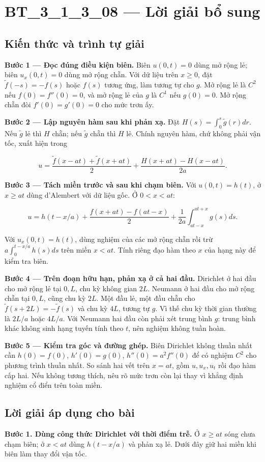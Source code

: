 \documentclass[10pt,a4paper]{article}
\begin{document}
\section*{BT\_3\_1\_3\_08 — Lời giải bổ sung}
\subsection*{Kiến thức và trình tự giải}
\textbf{Bước 1 — Đọc đúng điều kiện biên.} Biên $u(0,t)=0$ dùng mở rộng lẻ; biên $u_x(0,t)=0$ dùng mở rộng chẵn. Với dữ liệu trên $x\ge0$, đặt $\widetilde f(-s)=-f(s)$ hoặc $f(s)$ tương ứng, làm tương tự cho $g$. Mở rộng lẻ là $C^2$ nếu $f(0)=f''(0)=0$, và mở rộng lẻ của $g$ là $C^1$ nếu $g(0)=0$. Mở rộng chẵn đòi $f'(0)=g'(0)=0$ cho mức trơn ấy.

\textbf{Bước 2 — Lập nguyên hàm sau khi phản xạ.} Đặt $H(s)=\int_0^s\widetilde g(r)dr$. Nếu $\widetilde g$ lẻ thì $H$ chẵn; nếu $\widetilde g$ chẵn thì $H$ lẻ. Chính nguyên hàm, chứ không phải vận tốc, xuất hiện trong


\[
u=\frac{\widetilde f(x-at)+\widetilde f(x+at)}2+\frac{H(x+at)-H(x-at)}{2a}.
\]


\textbf{Bước 3 — Tách miền trước và sau khi chạm biên.} Với $u(0,t)=h(t)$, ở $x\ge at$ dùng d'Alembert với dữ liệu gốc. Ở $0<x<at$:


\[
u=h(t-x/a)+\frac{f(x+at)-f(at-x)}2+\frac1{2a}\int_{at-x}^{at+x}g(s)ds.
\]


Với $u_x(0,t)=h(t)$, dùng nghiệm của các mở rộng chẵn rồi trừ $a\int_0^{t-x/a}h(s)ds$ trên miền $x<at$. Tính riêng đạo hàm theo $x$ của hạng này để kiểm tra biên.

\textbf{Bước 4 — Trên đoạn hữu hạn, phản xạ ở cả hai đầu.} Dirichlet ở hai đầu cho mở rộng lẻ tại $0,L$, chu kỳ không gian $2L$. Neumann ở hai đầu cho mở rộng chẵn tại $0,L$, cũng chu kỳ $2L$. Một đầu lẻ, một đầu chẵn cho $\widetilde f(s+2L)=-\widetilde f(s)$ và chu kỳ $4L$, tương tự $g$. Vì thế chu kỳ thời gian thường là $2L/a$ hoặc $4L/a$. Với Neumann hai đầu còn phải xét trung bình $g$: trung bình khác không sinh hạng tuyến tính theo $t$, nên nghiệm không tuần hoàn.

\textbf{Bước 5 — Kiểm tra góc và đường ghép.} Biên Dirichlet không thuần nhất cần $h(0)=f(0)$, $h'(0)=g(0)$, $h''(0)=a^2f''(0)$ để có nghiệm $C^2$ cho phương trình thuần nhất. So sánh hai vết trên $x=at$, gồm $u,u_x,u_t$ rồi đạo hàm cấp hai. Nếu không tương thích, nêu rõ mức trơn còn lại thay vì khẳng định nghiệm cổ điển trên toàn miền.
\subsection*{Lời giải áp dụng cho bài}
\textbf{Bước 1. Dùng công thức Dirichlet với thời điểm trễ.} Ở $x\ge at$ sóng chưa chạm biên; ở $x<at$ dùng $h(t-x/a)$ và phản xạ lẻ. Dưới đây giữ hai miền khi biên làm thay đổi vận tốc.
\end{document}
